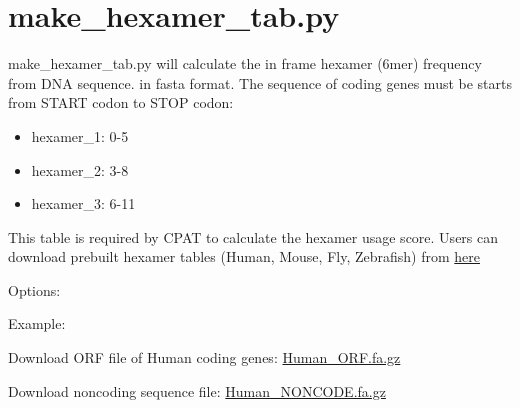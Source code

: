 \documentclass[letterpaper,10pt,english]{sphinxmanual}
\begin{document}
\section{make\_hexamer\_tab.py}
\label{index:make-hexamer-tab-py}
make\_hexamer\_tab.py will calculate the in frame hexamer (6mer) frequency from DNA sequence.
in fasta format. The sequence of coding genes must be starts from START codon to STOP codon:
\begin{itemize}
\item {} 
hexamer\_1: 0-5

\item {} 
hexamer\_2: 3-8

\item {} 
hexamer\_3: 6-11

\end{itemize}

This table is required by CPAT to calculate the hexamer usage score. Users can download
prebuilt hexamer tables (Human, Mouse, Fly, Zebrafish) from \href{https://sourceforge.net/projects/rna-cpat/files/prebuilt\_models.zip/download}{here}
\begin{description}
\item[{Options:}] \leavevmode{}

\end{description}

Example:

Download ORF file of Human coding genes: \href{https://downloads.sourceforge.net/project/rna-cpat/Human\_ORF.fa.gz?r=\&ts=1380987670\&use\_mirror=softlayer-dal}{Human\_ORF.fa.gz}

Download noncoding sequence file: \href{https://downloads.sourceforge.net/project/rna-cpat/Human\_NONCODE.fa.gz?r=\&ts=1380987795\&use\_mirror=softlayer-dal}{Human\_NONCODE.fa.gz}
\end{document}
